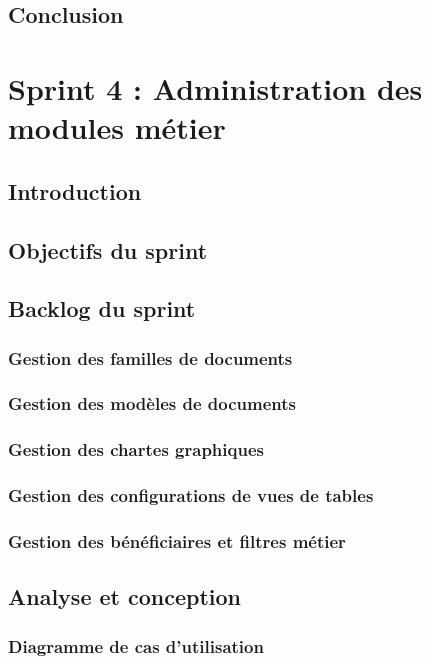 \documentclass[12pt,a4paper]{report}
\begin{document}
\section{Conclusion}


\chapter{Sprint 4 : Administration des modules métier}

\section{Introduction}
\section{Objectifs du sprint}
\section{Backlog du sprint}
\subsection{Gestion des familles de documents}
\subsection{Gestion des modèles de documents}
\subsection{Gestion des chartes graphiques}
\subsection{Gestion des configurations de vues de tables}
\subsection{Gestion des bénéficiaires et filtres métier}
\section{Analyse et conception}
\subsection{Diagramme de cas d'utilisation}
\end{document}
